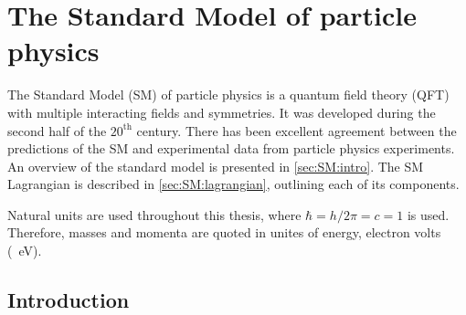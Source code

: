 \def \vacr {{\lvert\mkern1.5mu0\mkern1.5mu\rangle}}
\def \vacl {{\langle\mkern1.5mu0\mkern1.5mu\rvert}}

\chapter{The Standard Model of particle physics}\label{chap:SM}



The Standard Model (SM) of particle physics is a quantum field theory (QFT) with multiple interacting fields and symmetries. It was developed during the second half of the $20^{\mathrm{th}}$ century. There has been excellent agreement between the predictions of the SM and experimental data from particle physics experiments. An overview of the standard model is presented in \cref{sec:SM:intro}. The SM Lagrangian is described in \cref{sec:SM:lagrangian}, outlining each of its components.

Natural units are used throughout this thesis, where $\hbar=h/2\pi=c=1$ is used. Therefore, masses and momenta are quoted in unites of energy, electron volts (\SI{}{\electronvolt}). 
\section{Introduction}
